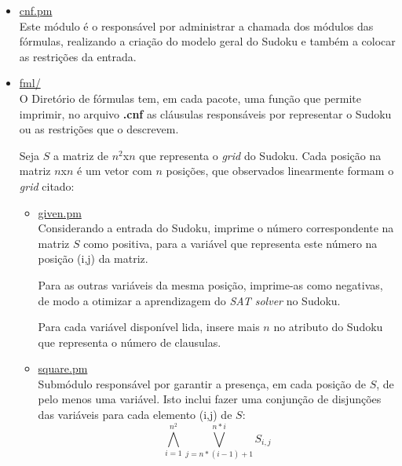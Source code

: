 \documentclass[a4paper]{article}
\begin{document}
\begin{itemize}
      \item \href{run:../lib/Sudoku/cnf.pm}{cnf.pm} \\
        Este módulo é o responsável por administrar a chamada dos 
        módulos das fórmulas, realizando a criação do modelo geral
        do Sudoku e também a colocar as restrições da entrada.
        
      \item \href{run:../lib/Sudoku/fml/}{fml/} \\
        O Diretório de fórmulas tem, em cada pacote, uma função que
        permite imprimir, no arquivo \textbf{.cnf} as cláusulas 
        responsáveis por representar o Sudoku ou as restrições que
        o descrevem.
        
        Seja $S$ a matriz de $n^2$x$n$ que representa o \emph{grid} 
        do Sudoku. Cada posição na matriz $n$x$n$ é um vetor com $n$
        posições, que observados linearmente formam o \emph{grid}
        citado:

        \begin{itemize}
        
          \item \href{run:../lib/Sudoku/fml/given.pm  }{given.pm  } \\
            Considerando a entrada do Sudoku, imprime o número 
            correspondente na matriz $S$ como positiva, para a 
            variável que representa este número na posição (i,j)
            da matriz. 
            
            Para as outras variáveis da mesma posição, imprime-as 
            como negativas, de modo a otimizar a aprendizagem do
            \emph{SAT solver} no Sudoku.
            
            Para cada variável disponível lida, insere mais $n$
            no atributo do Sudoku que representa o número de 
            clausulas.
            
          \item \href{run:../lib/Sudoku/fml/square.pm }{square.pm } \\
            Submódulo responsável por garantir a presença, em cada
            posição de $S$, de pelo menos uma variável. Isto inclui
            fazer uma conjunção de disjunções das variáveis para 
            cada elemento (i,j) de $S$:
            \begin{equation*}
              \bigwedge_{i=1}^{n^2} \bigvee_{j=n*(i-1)+1}^{n*i} S_{i,j}
            \end{equation*}
            

\end{itemize}
\end{itemize}
\end{document}
